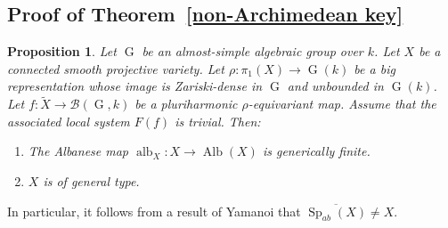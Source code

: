 \documentclass[11pt,letterpaper]{amsart}
\theoremstyle{plain}
\newtheorem{prop}[thm]{Proposition}
\DeclareMathOperator{\Sp}{Sp}
\DeclareMathOperator{\rG}{G}
\DeclareMathOperator{\Alb}{Alb}
\DeclareMathOperator{\alb}{alb}
\begin{document}
 
\subsection{Proof of Theorem~\ref{non-Archimedean key}}

\begin{prop}\label{non-Archimedean key-special case}
Let $\rG$ be an almost-simple algebraic group over $k$. Let $X$ be a connected smooth projective variety. Let $\rho \colon \pi_1(X) \rightarrow \rG(k)$ be a big representation whose image is Zariski-dense in $\rG$ and unbounded in $\rG(k)$. Let $f \colon \tilde{X} \to \mathscr{B}(\rG, k)$ be a pluriharmonic $\rho$-equivariant map. Assume that the associated local system $F(f)$ is trivial. Then:
\begin{enumerate}
    \item The Albanese map $\alb_X \colon X \to \Alb(X)$ is generically finite.  
    \item $X$ is of general type.
\end{enumerate}
\end{prop}

In particular, it follows from a result of Yamanoi \cite[Corollary 1]{Yamanoi-maximal-Albanese} that $\overline{\Sp_{ab}(X)} \neq X$.
\end{document}
